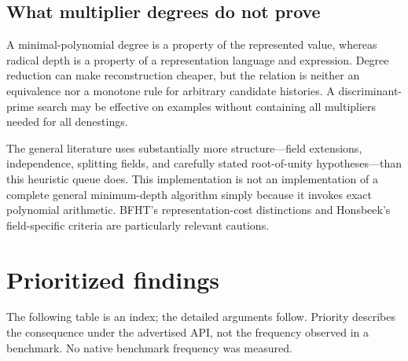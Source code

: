 \documentclass[11pt,letterpaper]{article}
\theoremstyle{definition}
\begin{document}
\subsection{What multiplier degrees do not prove}

A minimal-polynomial degree is a property of the represented value, whereas radical depth is a property of a representation language and expression. Degree reduction can make reconstruction cheaper, but the relation is neither an equivalence nor a monotone rule for arbitrary candidate histories. A discriminant-prime search may be effective on examples without containing all multipliers needed for all denestings.

The general literature uses substantially more structure---field extensions, independence, splitting fields, and carefully stated root-of-unity hypotheses---than this heuristic queue does. This implementation is not an implementation of a complete general minimum-depth algorithm simply because it invokes exact polynomial arithmetic. BFHT's representation-cost distinctions and Honsbeek's field-specific criteria are particularly relevant cautions.\cite{bfht,honsbeek}

\section{Prioritized findings}\label{sec:findings}

The following table is an index; the detailed arguments follow. Priority describes the consequence under the advertised API, not the frequency observed in a benchmark. No native benchmark frequency was measured.
\end{document}

